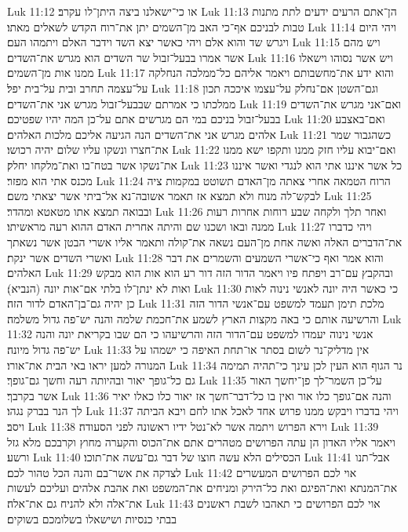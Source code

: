Luk 11:12  או כי־ישאלנו ביצה היתן־לו עקרב׃
Luk 11:13  הן־אתם הרעים ידעים לתת מתנות טבות לבניכם אף־כי האב מן־השמים יתן את־רוח הקדש לשאלים מאתו׃
Luk 11:14  ויהי היום ויגרש שד והוא אלם ויהי כאשר יצא השד וידבר האלם ויתמהו העם׃
Luk 11:15  ויש מהם אשר אמרו בבעל־זבול שר השדים הוא מגרש את־השדים׃
Luk 11:16  ויש אשר נסוהו וישאלו ממנו אות מן־השמים׃
Luk 11:17  והוא ידע את־מחשבותם ויאמר אליהם כל־ממלכה הנחלקה על־עצמה תחרב ובית על־בית יפל׃
Luk 11:18  וגם־השטן אם־נחלק על־עצמו איככה תכון ממלכתו כי אמרתם שבבעל־זבול מגרש אני את־השדים׃
Luk 11:19  ואם־אני מגרש את־השדים בבעל־זבול בניכם במי הם מגרשים אתם על־כן המה יהיו שפטיכם׃
Luk 11:20  ואם־באצבע אלהים מגרש אני את־השדים הנה הגיעה אליכם מלכות האלהים׃
Luk 11:21  כשהגבור שמר את־חצרו ונשקו עליו שלום יהיה רכושו׃
Luk 11:22  ואם־יבוא עליו חזק ממנו ותקפו ישא ממנו את־נשקו אשר בטח־בו ואת־מלקחו יחלק׃
Luk 11:23  כל אשר איננו אתי הוא לנגדי ואשר איננו מכנס אתי הוא מפזר׃
Luk 11:24  הרוח הטמאה אחרי צאתה מן־האדם תשוטט במקמות ציה לבקש־לה מנוח ולא תמצא אז תאמר אשובה־נא אל־ביתי אשר יצאתי משם׃
Luk 11:25  ובבואה תמצא אתו מטאטא ומהדר׃
Luk 11:26  ואחר תלך ולקחה שבע רוחות אחרות רעות ממנה ובאו ושכנו שם והיתה אחרית האדם ההוא רעה מראשיתו׃
Luk 11:27  ויהי כדברו את־הדברים האלה ואשה אחת מן־העם נשאה את־קולה ותאמר אליו אשרי הבטן אשר נשאתך ואשרי השדים אשר ינקת׃
Luk 11:28  והוא אמר ואף כי־אשרי השמעים והשמרים את דבר האלהים׃
Luk 11:29  ובהקבץ עם־רב ויפתח פיו ויאמר הדור הזה דור רע הוא אות הוא מבקש ואות לא ינתן־לו בלתי אם־אות יונה (הנביא)׃
Luk 11:30  כי כאשר היה יונה לאנשי נינוה לאות כן יהיה גם־בן־האדם לדור הזה׃
Luk 11:31  מלכת תימן תעמד למשפט עם־אנשי הדור הזה והרשיעה אותם כי באה מקצות הארץ לשמע את־חכמת שלמה והנה יש־פה גדול משלמה׃
Luk 11:32  אנשי נינוה יעמדו למשפט עם־הדור הזה והרשיעהו כי הם שבו בקריאת יונה והנה יש־פה גדול מיונה׃
Luk 11:33  אין מדליק־נר לשום בסתר או־תחת האיפה כי ישמהו על המנורה למען יראו באי הבית את־אורו׃
Luk 11:34  נר הגוף הוא העין לכן עינך כי־תהיה תמימה גם כל־גופך יאור ובהיותה רעה וחשך גם־גופך׃
Luk 11:35  על־כן השמר־לך פן־יחשך האור אשר בקרבך׃
Luk 11:36  והנה אם־גופך כלו אור ואין בו כל־דבר־חשך אז יאור כלו כאלו יאיר לך הנר בברק נגהו׃
Luk 11:37  ויהי בדברו ויבקש ממנו פרוש אחד לאכל אתו לחם ויבא הביתה ויסב׃
Luk 11:38  וירא הפרוש ויתמה אשר לא־נטל ידיו ראשונה לפני הסעודה׃
Luk 11:39  ויאמר אליו האדון הן עתה הפרושים מטהרים אתם את־הכוס והקערה מחוץ וקרבכם מלא גזל ורשע׃
Luk 11:40  הכסילים הלא עשה חוצו של דבר גם־עשה את־תוכו׃
Luk 11:41  אבל־תנו לצדקה את אשר־בם והנה הכל טהור לכם׃
Luk 11:42  אוי לכם הפרושים המעשרים את־המנתא ואת־הפיגם ואת כל־הירק ומניחים את־המשפט ואת אהבת אלהים ועליכם לעשות את־אלה ולא להניח גם את־אלה׃
Luk 11:43  אוי לכם הפרושים כי תאהבו לשבת ראשנים בבתי כנסיות ושישאלו בשלומכם בשוקים׃
